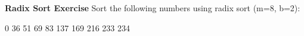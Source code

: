 \documentclass{article}
\begin{document}
\textbf{Radix Sort Exercise}
\newline Sort the following numbers using radix sort (m=8, b=2):
\begin{center}
0 36 51 69 83 137 169 216 233 234 \end{center}
\end{document}
